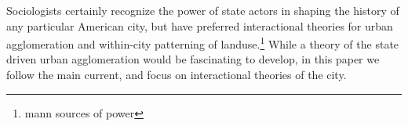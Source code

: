 Sociologists certainly recognize the power of state actors in shaping
the history of any particular American city, but have preferred
interactional theories for urban agglomeration and within-city
patterning of landuse.\footnote{mann sources of power} While a theory
of the state driven urban agglomeration would be fascinating to
develop, in this paper we follow the main current, and focus on
interactional theories of the city.


